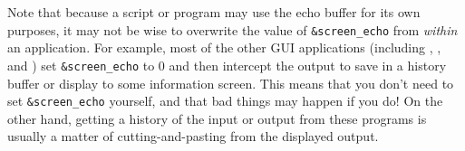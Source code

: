 Note that because a script or program may use the echo buffer for its own
purposes, it may not be wise to overwrite the value of
{\tt{\&screen\_echo}} from {\emph{within}} an {\ifeffit} application.  For
example, most of the other GUI applications (including {\gifeffit},
{\athena}, and {\artemis}) set {\tt{\&screen\_echo}} to 0 and then
intercept the output to save in a history buffer or display to some
information screen.  This means that you don't need to set
{\tt{\&screen\_echo}} yourself, and that bad things may happen if you do!
On the other hand, getting a history of the input or output from these
programs is usually a matter of cutting-and-pasting from the displayed
output.






